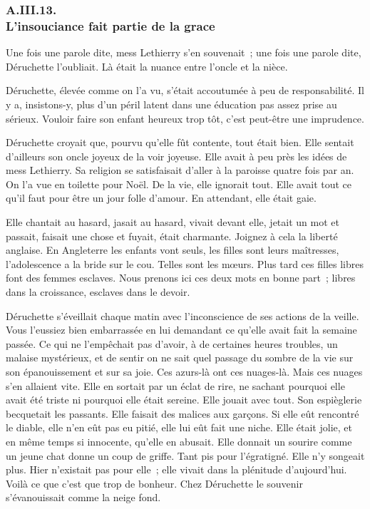 \documentclass[french,twoside]{book} %
\begin{document}
 \subsubsection[{A.III.13. L’insouciance fait partie de la grace}]{A.III.13. \\
L’insouciance fait partie de la grace}
\noindent Une fois une parole dite, mess Lethierry s’en souvenait ; une fois une parole dite, Déruchette l’oubliait. Là était la nuance entre l’oncle et la nièce.\par
Déruchette, élevée comme on l’a vu, s’était accoutumée à peu de responsabilité. Il y a, insistons-y, plus d’un péril latent dans une éducation pas assez prise au sérieux. Vouloir faire son enfant heureux trop tôt, c’est peut-être une imprudence.\par
Déruchette croyait que, pourvu qu’elle fût contente, tout était bien. Elle sentait d’ailleurs son oncle joyeux de la voir joyeuse. Elle avait à peu près les idées de mess Lethierry. Sa religion se satisfaisait d’aller à la paroisse quatre fois par an. On l’a vue en toilette pour Noël. De la vie, elle ignorait tout. Elle avait tout ce qu’il faut pour être un jour folle d’amour. En attendant, elle était gaie.\par
Elle chantait au hasard, jasait au hasard, vivait devant elle, jetait un mot et passait, faisait une chose  et fuyait, était charmante. Joignez à cela la liberté anglaise. En Angleterre les enfants vont seuls, les filles sont leurs maîtresses, l’adolescence a la bride sur le cou. Telles sont les mœurs. Plus tard ces filles libres font des femmes esclaves. Nous prenons ici ces deux mots en bonne part ; libres dans la croissance, esclaves dans le devoir.\par
Déruchette s’éveillait chaque matin avec l’inconscience de ses actions de la veille. Vous l’eussiez bien embarrassée en lui demandant ce qu’elle avait fait la semaine passée. Ce qui ne l’empêchait pas d’avoir, à de certaines heures troubles, un malaise mystérieux, et de sentir on ne sait quel passage du sombre de la vie sur son épanouissement et sur sa joie. Ces azurs-là ont ces nuages-là. Mais ces nuages s’en allaient vite. Elle en sortait par un éclat de rire, ne sachant pourquoi elle avait été triste ni pourquoi elle était sereine. Elle jouait avec tout. Son espièglerie becquetait les passants. Elle faisait des malices aux garçons. Si elle eût rencontré le diable, elle n’en eût pas eu pitié, elle lui eût fait une niche. Elle était jolie, et en même temps si innocente, qu’elle en abusait. Elle donnait un sourire comme un jeune chat donne un coup de griffe. Tant pis pour l’égratigné. Elle n’y songeait plus. Hier n’existait pas pour elle ; elle vivait dans la plénitude d’aujourd’hui. Voilà ce que c’est que trop de bonheur. Chez Déruchette le souvenir s’évanouissait comme la neige fond.
\end{document}
